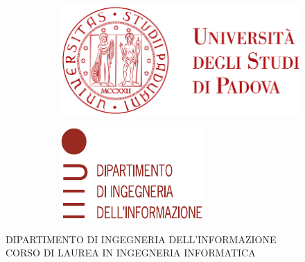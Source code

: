 \begin{titlepage}
        \begin{figure}
            \centering
            \begin{subfigure}[b]{0.4\textwidth}
                \includegraphics[width=\textwidth]{Immagini/logo_unipd}
            \end{subfigure}
            \hfill
            \begin{subfigure}[b]{0.3\textwidth}
                \includegraphics[width=\textwidth]{Immagini/logo_dei}
            \end{subfigure}
        \end{figure}
    
    
        \begin{center}
            \makeatletter %

            \textsc{DIPARTIMENTO DI INGEGNERIA DELL'INFORMAZIONE}\\
            \textsc{CORSO DI LAUREA IN INGEGNERIA INFORMATICA}
    

\end{center}
\end{titlepage}
